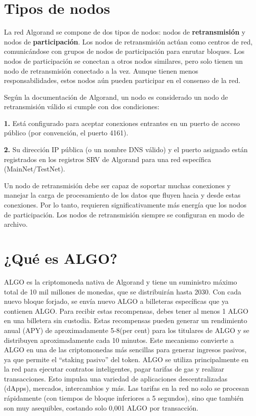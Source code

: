 \documentclass{article}
\begin{document}
\section{Tipos de nodos}

La red Algorand se compone de dos tipos de nodos: nodos de \textbf{retransmisión} y nodos de \textbf{participación}. Los nodos de retransmisión actúan como centros de red, comunicándose con grupos de nodos de participación para enrutar bloques. Los nodos de participación se conectan a otros nodos similares, pero solo tienen un nodo de retransmisión conectado a la vez. Aunque tienen menos responsabilidades, estos nodos aún pueden participar en el consenso de la red.

Según la documentación de Algorand, un nodo es considerado un nodo de retransmisión válido si cumple con dos condiciones:


\textbf{1. }Está configurado para aceptar conexiones entrantes en un puerto de acceso público (por convención, el puerto 4161).

\textbf{2. }Su dirección IP pública (o un nombre DNS válido) y el puerto asignado están registrados en los registros SRV de Algorand para una red específica (MainNet/TestNet).

Un nodo de retransmisión debe ser capaz de soportar muchas conexiones y manejar la carga de procesamiento de los datos que fluyen hacia y desde estas conexiones. Por lo tanto, requieren significativamente más energía que los nodos de participación. Los nodos de retransmisión siempre se configuran en modo de archivo.


\section{¿Qué es ALGO?}

ALGO es la criptomoneda nativa de Algorand y tiene un suministro máximo total de 10 mil millones de monedas, que se distribuirán hasta 2030. Con cada nuevo bloque forjado, se envía nuevo ALGO a billeteras específicas que ya contienen ALGO. Para recibir estas recompensas, debes tener al menos 1 ALGO en una billetera sin custodia. Estas recompensas pueden generar un rendimiento anual (APY) de aproximadamente 5-8(per cent) para los titulares de ALGO y se distribuyen aproximadamente cada 10 minutos. Este mecanismo convierte a ALGO en una de las criptomonedas más sencillas para generar ingresos pasivos, ya que permite el “staking pasivo” del token.
ALGO se utiliza principalmente en la red para ejecutar contratos inteligentes, pagar tarifas de gas y realizar transacciones. Esto impulsa una variedad de aplicaciones descentralizadas (dApps), mercados, intercambios y más. Las tarifas en la red no solo se procesan rápidamente (con tiempos de bloque inferiores a 5 segundos), sino que también son muy asequibles, costando solo 0,001 ALGO por transacción.
\end{document}
